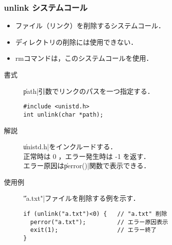 \documentclass{beamer}                 %
\begin{document}
\begin{frame}[fragile]
  \frametitle{unlink システムコール}
  \begin{itemize}
    \item ファイル（リンク）を削除するシステムコール．
    \item ディレクトリの削除には使用できない．
    \item rmコマンドは，このシステムコールを使用．
  \end{itemize}

\begin{description}
\item[書式] \|path|引数でリンクのパスを一つ指定する．

\begin{verbatim}
#include <unistd.h>
int unlink(char *path);
\end{verbatim}

\item[解説] \|unistd.h|をインクルードする．\\
正常時は 0 ，エラー発生時は -1 を返す．\\
エラー原因は\|perror()|関数で表示できる．

\item[使用例] \|"a.txt"|ファイルを削除する例を示す．

\begin{verbatim}
if (unlink("a.txt")<0) {   // "a.txt" 削除
  perror("a.txt");         // エラー原因表示
  exit(1);                 // エラー終了
}
\end{verbatim}

  \end{description}
\end{frame}
\end{document}
